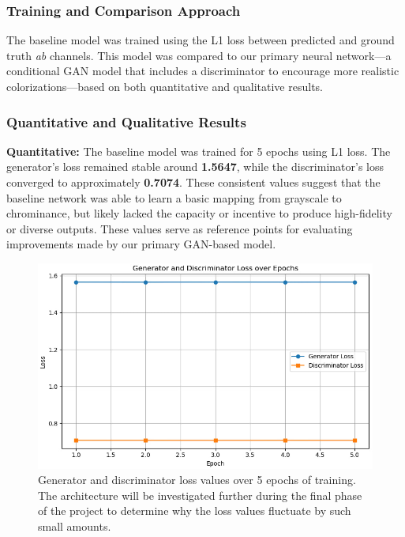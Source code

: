\documentclass{article} %
\begin{document}
\subsubsection{Training and Comparison Approach}

The baseline model was trained using the L1 loss between predicted and ground truth \textit{ab} channels. This model was compared to our primary neural network—a conditional 
GAN model that includes a discriminator to encourage more realistic colorizations—based on both quantitative and qualitative results.

\subsubsection{Quantitative and Qualitative Results}

\textbf{Quantitative:} The baseline model was trained for 5 epochs using L1 loss. The generator's loss remained stable around \textbf{1.5647}, while the discriminator's loss 
converged to approximately \textbf{0.7074}. These consistent values suggest that the baseline network was able to learn a basic mapping from grayscale to chrominance, but likely 
lacked the capacity or incentive to produce high-fidelity or diverse outputs. These values serve as reference points for evaluating improvements made by our primary GAN-based model.

\begin{figure}[htbp]
    \centering
    \includegraphics[width=\textwidth]{Figs/baseline_learning_curve.jpg}
    \caption{Generator and discriminator loss values over 5 epochs of training. The architecture will be investigated further during the final phase of the project to determine why 
    the loss values fluctuate by such small amounts.}

    \label{fig:baseline_outputs}
\end{figure}
\end{document}
